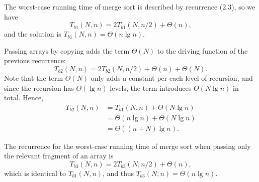 The worst-case running time of merge sort is described by recurrence (2.3), so we have
\[
    T_{b1}(N,n) = 2T_{b1}(N,n/2)+\Theta(n),
\]
and the solution is $T_{b1}(N,n)=\Theta(n\lg n)$.

Passing arrays by copying adds the term $\Theta(N)$ to the driving function of the previous recurrence:
\[
    T_{b2}(N,n) = 2T_{b2}(N,n/2)+\Theta(n)+\Theta(N).
\]
Note that the term $\Theta(N)$ only adds a constant per each level of recursion, and since the recursion has $\Theta(\lg n)$ levels, the term introduces $\Theta(N\lg n)$ in total.
Hence,
\begin{align*}
    T_{b2}(N,n) &= T_{b1}(N,n)+\Theta(N\lg n) \\
    &= \Theta(n\lg n)+\Theta(N\lg n) \\
    &= \Theta((n+N)\lg n).
\end{align*}

The recurrence for the worst-case running time of merge sort when passing only the relevant fragment of an array is
\[
    T_{b3}(N,n) = 2T_{b3}(N,n/2)+\Theta(n),
\]
which is identical to $T_{b1}(N,n)$, and thus $T_{b3}(N,n)=\Theta(n\lg n)$.
